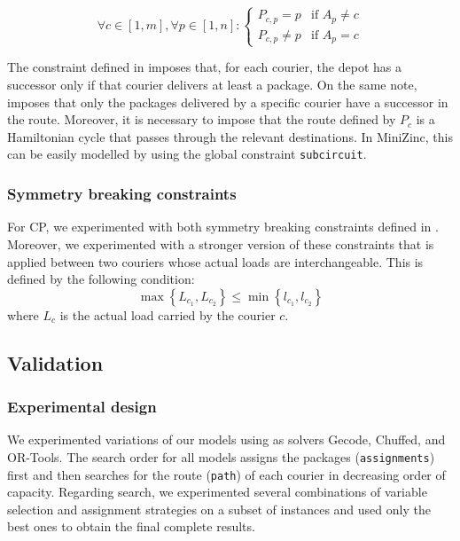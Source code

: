 \begin{equation}
    \label{eq:cp_constr_route_packs}
    \forall c \in [1, m],
    \forall p \in [1, n]: 
    \begin{cases}
        P_{c, p} = p    & \text{if $A_p \neq c$} \\
        P_{c, p} \neq p & \text{if $A_p = c$} 
    \end{cases}
\end{equation}

The constraint defined in  imposes that, for each courier, the depot has a successor only if that courier delivers at least a package. On the same note,  imposes that only the packages delivered by a specific courier have a successor in the route.
Moreover, it is necessary to impose that the route defined by $P_c$ is a Hamiltonian cycle that passes through the relevant destinations. In MiniZinc, this can be easily modelled by using the global constraint \texttt{subcircuit}.


\subsubsection{Symmetry breaking constraints}

For CP, we experimented with both symmetry breaking constraints defined in . Moreover, we experimented with a stronger version of these constraints that is applied between two couriers whose actual loads are interchangeable. This is defined by the following condition:
\begin{equation}
    \label{eq:cp_symm_strong}
    \max\left\{ L_{c_1}, L_{c_2} \right\} \leq \min\left\{ l_{c_1}, l_{c_2} \right\}
\end{equation}
where $L_c$ is the actual load carried by the courier $c$.



\subsection{Validation}

\subsubsection{Experimental design}

We experimented variations of our models using as solvers Gecode, Chuffed, and OR-Tools. The search order for all models assigns the packages (\texttt{assignments}) first and then searches for the route (\texttt{path}) of each courier in decreasing order of capacity. Regarding search, we experimented several combinations of variable selection and assignment strategies on a subset of instances and used only the best ones to obtain the final complete results.


